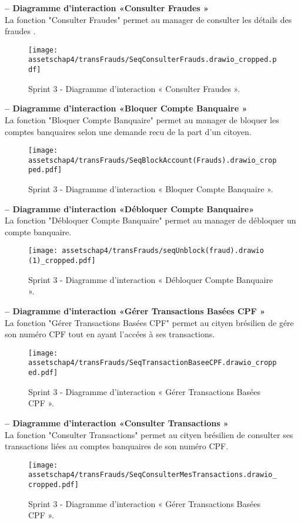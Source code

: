 \textbf{– Diagramme d'interaction «Consulter Fraudes »}\\
La fonction "Consulter Fraudes" permet au manager de consulter les détails des fraudes .
\begin{figure}[H]
\centering
\texttt{[image: assetschap4/transFrauds/SeqConsulterFrauds.drawio\_cropped.pdf]}
\caption{ Sprint 3 - Diagramme d'interaction « Consulter Fraudes ». }
\end{figure}




\textbf{– Diagramme d'interaction «Bloquer Compte Banquaire »}\\
La fonction "Bloquer Compte Banquaire" permet au manager de bloquer les comptes banquaires selon une demande recu de la part d'un citoyen.
\begin{figure}[H]
\centering
\texttt{[image: assetschap4/transFrauds/SeqBlockAccount(Frauds).drawio\_cropped.pdf]}
\caption{ Sprint 3 - Diagramme d'interaction « Bloquer Compte Banquaire ». }
\end{figure}




\textbf{– Diagramme d'interaction «Débloquer Compte Banquaire»}\\
La fonction "Débloquer Compte Banquaire" permet au manager de débloquer un compte banquaire.
\begin{figure}[H]
\centering
\texttt{[image: assetschap4/transFrauds/seqUnblock(fraud).drawio (1)\_cropped.pdf]}
\caption{ Sprint 3 - Diagramme d'interaction « Débloquer Compte Banquaire ». }
\end{figure}




\textbf{– Diagramme d'interaction «Gérer Transactions Basées CPF »}\\
La fonction "Gérer Transactions Basées CPF" permet au cityen brésilien de gére son numéro CPF tout en ayant l'accées à ses transactions.
\begin{figure}[H]
\centering
\texttt{[image: assetschap4/transFrauds/SeqTransactionBaseeCPF.drawio\_cropped.pdf]}
\caption{ Sprint 3 - Diagramme d'interaction « Gérer Transactions Basées CPF ». }
\end{figure}






\textbf{– Diagramme d'interaction «Consulter Transactions »}\\
La fonction "Consulter Transactions" permet au cityen brésilien de consulter ses transactions liées au comptes banquaires de son numéro CPF.
\begin{figure}[H]
\centering
\texttt{[image: assetschap4/transFrauds/SeqConsulterMesTransactions.drawio\_cropped.pdf]}
\caption{ Sprint 3 - Diagramme d'interaction « Gérer Transactions Basées CPF ». }
\end{figure}




